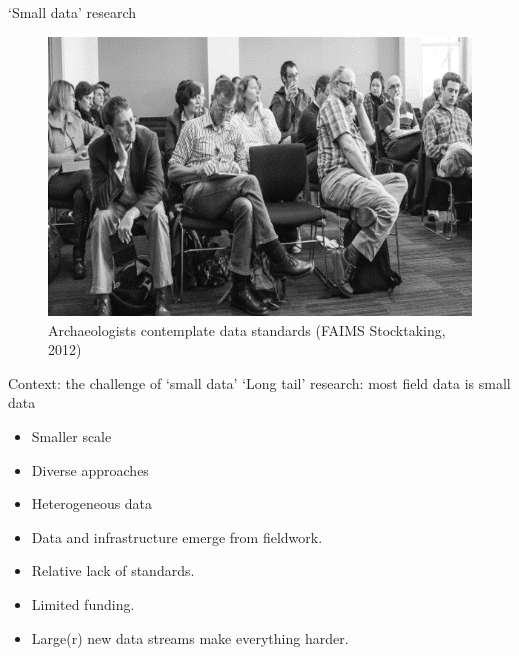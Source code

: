 \documentclass[
	aspectratio=169, %
	12pt, %
	t, %
]{beamer}
\begin{document}
\begin{refsegment}
\begin{frame}{`Small data' research}
 \begin{figure}[H]
    \centering
        \vspace{-0.5cm}
        \includegraphics[height=.725\textheight]{figures/Archaeologists-standards.png}
        \caption{Archaeologists contemplate data standards (FAIMS Stocktaking, 2012)}
        \label{fig:figure7}
 \end{figure}
\end{frame}


\begin{frame}{Context: the challenge of `small data'}
    `Long tail' research: most field data is small data \parencite{Borgman2015-rh}
    \begin{itemize}
        \item Smaller scale
        \item Diverse approaches
        \item Heterogeneous data
        \item Data and infrastructure emerge from fieldwork. 
        \item Relative lack of standards.
        \item Limited funding.
        \item Large(r) new data streams make everything harder.
    \end{itemize}
\end{frame}


\end{refsegment}
\end{document}
